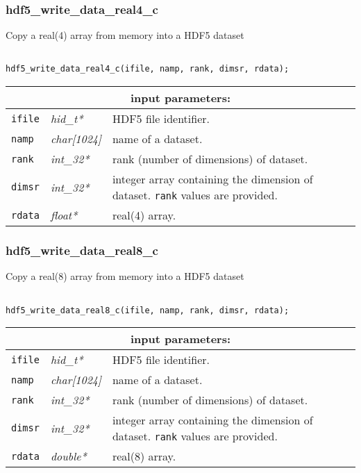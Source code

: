 \subsubsection{hdf5\_write\_data\_real4\_c}

Copy a real(4) array from memory into a HDF5 dataset

\begin{verbatim}

hdf5_write_data_real4_c(ifile, namp, rank, dimsr, rdata);
\end{verbatim}

\noindent
\begin{tabular}{|p{1.5cm}|p{2cm}|p{11cm}|}
\hline
\multicolumn{3}{|c|}{\bf input parameters:} \\
\hline
{\tt ifile} & {\it hid\_t*} & HDF5 file identifier. \\
\hline
{\tt namp} & {\it char[1024]} & name of a dataset. \\
\hline
{\tt rank} & {\it int\_32*} & rank (number of dimensions) of dataset. \\
\hline
{\tt dimsr} & {\it int\_32*} & integer array containing the dimension of dataset. {\tt rank} values are provided. \\
\hline
{\tt rdata} & {\it float*} & real(4) array. \\
\hline
\end{tabular}

\subsubsection{hdf5\_write\_data\_real8\_c}

Copy a real(8) array from memory into a HDF5 dataset

\begin{verbatim}

hdf5_write_data_real8_c(ifile, namp, rank, dimsr, rdata);
\end{verbatim}

\noindent
\begin{tabular}{|p{1.5cm}|p{2cm}|p{11cm}|}
\hline
\multicolumn{3}{|c|}{\bf input parameters:} \\
\hline
{\tt ifile} & {\it hid\_t*} & HDF5 file identifier. \\
\hline
{\tt namp} & {\it char[1024]} & name of a dataset. \\
\hline
{\tt rank} & {\it int\_32*} & rank (number of dimensions) of dataset. \\
\hline
{\tt dimsr} & {\it int\_32*} & integer array containing the dimension of dataset. {\tt rank} values are provided. \\
\hline
{\tt rdata} & {\it double*} & real(8) array. \\
\hline
\end{tabular}

